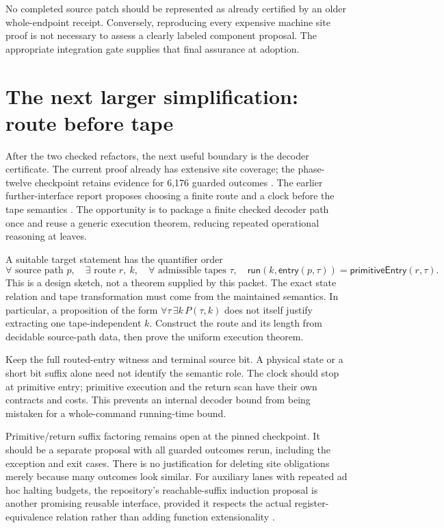 \documentclass[11pt]{article}
\begin{document}
No completed source patch should be represented as already certified by an
older whole-endpoint receipt. Conversely, reproducing every expensive machine
site proof is not necessary to assess a clearly labeled component proposal.
The appropriate integration gate supplies that final assurance at adoption.

\section{The next larger simplification: route before tape}
\label{sec:decoder}

After the two checked refactors, the next useful boundary is the decoder
certificate. The current proof already has extensive site coverage; the
phase-twelve checkpoint retains evidence for 6,176 guarded outcomes
\cite{phase12}. The earlier further-interface report proposes choosing a
finite route and a clock before the tape semantics \cite{furtherinterface}.
The opportunity is to package a finite checked decoder path once and reuse a
generic execution theorem, reducing repeated operational reasoning at leaves.

A suitable target statement has the quantifier order
\[
 \forall\text{ source path }p,\quad
 \exists\text{ route }r,\ k,\quad
 \forall\text{ admissible tapes }\tau,\quad
 \mathsf{run}(k,\mathsf{entry}(p,\tau))
       =\mathsf{primitiveEntry}(r,\tau).
\]
This is a design sketch, not a theorem supplied by this packet. The exact
state relation and tape transformation must come from the maintained
semantics. In particular, a proposition of the form
$\forall\tau\,\exists k\,P(\tau,k)$ does not itself justify extracting one
tape-independent $k$. Construct the route and its length from decidable
source-path data, then prove the uniform execution theorem.

Keep the full routed-entry witness and terminal source bit. A physical state
or a short bit suffix alone need not identify the semantic role. The clock
should stop at primitive entry; primitive execution and the return scan have
their own contracts and costs. This prevents an internal decoder bound from
being mistaken for a whole-command running-time bound.

Primitive/return suffix factoring remains open at the pinned checkpoint.
It should be a separate proposal with all guarded outcomes rerun, including
the exception and exit cases. There is no justification for deleting site
obligations merely because many outcomes look similar. For auxiliary lanes
with repeated ad hoc halting budgets, the repository's reachable-suffix
induction proposal is another promising reusable interface, provided it
respects the actual register-equivalence relation rather than adding function
extensionality \cite{furtherinterface}.
\end{document}
